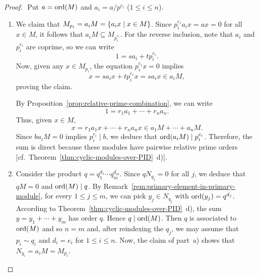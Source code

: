 \begin{proof}${}$ Put $a=\operatorname{ord}(M)$ and $a_i=a/p^{e_i}$ ($1\le i\le n$).
\begin{enumerate}[\rm a)]
    \item We claim that $M_{p_i} = a_i M = \{a_i x \mid x \in M\}$. Since $p_i^{e_i} a_i x = a x = 0$ for all $x \in M$, it follows that $a_i M \subseteq M_{p_i^{e_i}}$. For the reverse inclusion, note that $a_i$ and $p_i^{e_i}$ are coprime, so we can write
    $$
    1 = s a_i + t p_i^{e_i}.
    $$
    Now, given any $x \in M_{p_i}$, the equation $p_i^{e_i} x = 0$ implies
    $$
    x = s a_i x + t p_i^{e_i} x = s a_i x \in a_i M,
    $$
    proving the claim.

    By Proposition~\ref{prop:relative-prime-combination}, we can write
    $$
        1 = r_1a_1+\cdots+r_na_n.
    $$
    Thus, given $x\in M$,
    $$
        x = r_1a_1x+\cdots+r_na_nx\in a_1M+\cdots+a_nM.
    $$
    Since $ba_iM=0$ implies $p_i^{e_i}\mid b$, we deduce that $\operatorname{ord}(a_iM)\mid p_i^{e_i}$. Therefore, the sum is direct because these modules have pairwise relative prime orders [cf.~Theorem~\ref{thm:cyclic-modules-over-PID}~d)].

    \item Consider the product $q=q_1^{d_1}\cdots q_m^{d_m}$. Since $qN_{q_j}=0$ for all $j$, we deduce that $qM=0$ and $\operatorname{ord}(M)\mid q$. By Remark~\ref{rem:primary-element-in-primary-module}, for every $1\le j\le m$, we can pick $y_j\in N_{q_j}$ with $\operatorname{ord}(y_j)=q^{d_j}$. According to Theorem~\ref{thm:cyclic-modules-over-PID}~d), the sum $y=y_1+\cdots+y_m$ has order $q$. Hence $q\mid\operatorname{ord}(M)$. Then $q$ is associated to $\operatorname{ord}(M)$ and so $n=m$ and, after reindexing the $q_j$, we may assume that $p_i\sim q_i$ and $d_i=e_i$ for $1\le i\le n$. Now, the claim of part~a) shows that $N_{q_i}=a_iM=M_{p_i}$.
\end{enumerate}
\end{proof}

